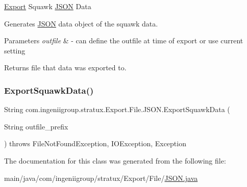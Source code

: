 \hyperlink{namespacecom_1_1ingeniigroup_1_1stratux_1_1_export}{Export} Squawk \hyperlink{classcom_1_1ingeniigroup_1_1stratux_1_1_export_1_1_file_1_1_j_s_o_n}{J\+S\+ON} Data

Generates \hyperlink{classcom_1_1ingeniigroup_1_1stratux_1_1_export_1_1_file_1_1_j_s_o_n}{J\+S\+ON} data object of the squawk data.


\begin{DoxyParams}{Parameters}
{\em outfile} & -\/ can define the outfile at time of export or use current setting\\
\hline
\end{DoxyParams}
\begin{DoxyReturn}{Returns}
file that data was exported to. 
\end{DoxyReturn}
\mbox{\label{classcom_1_1ingeniigroup_1_1stratux_1_1_export_1_1_file_1_1_j_s_o_n_a87734bd945620c9b18ab1edfae32d336}} 
\subsubsection{\texorpdfstring{Export\+Squawk\+Data()}{ExportSquawkData()}\hspace{0.1cm}{\footnotesize\ttfamily [2/2]}}
{\footnotesize\ttfamily String com.\+ingeniigroup.\+stratux.\+Export.\+File.\+J\+S\+O\+N.\+Export\+Squawk\+Data (\begin{DoxyParamCaption}\item[{String}]{outfile\+\_\+prefix }\end{DoxyParamCaption}) throws File\+Not\+Found\+Exception, I\+O\+Exception, Exception}



The documentation for this class was generated from the following file\+:\begin{DoxyCompactItemize}
\item 
main/java/com/ingeniigroup/stratux/\+Export/\+File/\hyperlink{_export_2_file_2_j_s_o_n_8java}{J\+S\+O\+N.\+java}\end{DoxyCompactItemize}
